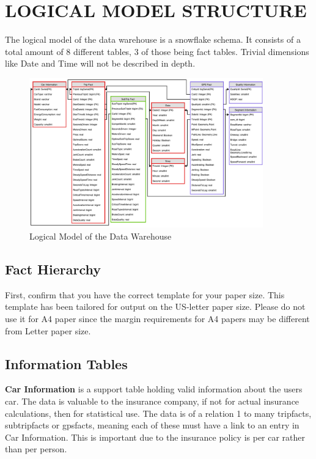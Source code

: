 \section{LOGICAL MODEL STRUCTURE}\label{sec:dataware}

The logical model of the data warehouse is a snowflake schema. It consists of a total amount of 8 different tables, 3 of those being fact tables. Trivial dimensions like Date and Time will not be described in depth.

\begin{figure}[tb]
\centering
\includegraphics[width=0.9\textwidth]{Pictures/ERDiagram}
\caption{Logical Model of the Data Warehouse}
\label{fig:datawarehouse}
\end{figure}

\subsection{Fact Hierarchy}

First, confirm that you have the correct template for your paper size. This template has been tailored for output on the US-letter paper size. Please do not use it for A4 paper since the margin requirements for A4 papers may be different from Letter paper size.

\subsection{Information Tables}

\textbf{Car Information} is a support table holding valid information about the users car. The data is valuable to the insurance company, if not for actual insurance calculations, then for statistical use. The data is of a relation 1 to many tripfacts, subtripfacts or gpsfacts, meaning each of these must have a link to an entry in Car Information. This is important due to the insurance policy is per car rather than per person.

